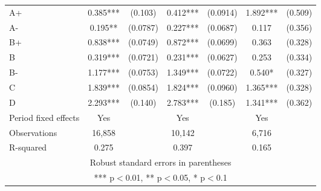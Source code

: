 \documentclass[12pt]{article}
\begin{document}
\begin{table}[H]
{\begin{tabular}{lcccccc}
    A+ & 0.385*** & (0.103) & 0.412*** & (0.0914) & 1.892*** & (0.509) \\
    A- & 0.195** & (0.0787) & 0.227*** & (0.0687) & 0.117 & (0.356) \\
    B+ & 0.838*** & (0.0749) & 0.872*** & (0.0699) & 0.363 & (0.328) \\
    B  & 0.319*** & (0.0721) & 0.231*** & (0.0627) & 0.253 & (0.334) \\
    B- & 1.177*** & (0.0753) & 1.349*** & (0.0722) & 0.540* & (0.327) \\
    C  & 1.839*** & (0.0854) & 1.824*** & (0.0960) & 1.365*** & (0.328) \\
    D  & 2.293*** & (0.140) & 2.783*** & (0.185) & 1.341*** & (0.362) \vspace{2mm} \\
    \midrule
    Period fixed effects & Yes & & Yes & & Yes & \\
    Observations & 16,858 & & 10,142 & & 6,716 & \\
    R-squared & 0.275 & & 0.397 & & 0.165 & \\
    \bottomrule
    \multicolumn{7}{c}{Robust standard errors in parentheses} \\
    \multicolumn{7}{c}{*** p$<$0.01, ** p$<$0.05, * p$<$0.1} \\
    \end{tabular}%
    }
\end{table}
\end{document}
